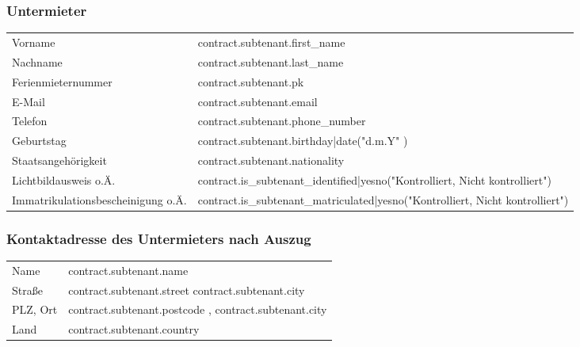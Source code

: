 \documentclass[9pt,pdftex,a4paper]{article}
\begin{document}
\subsubsection*{Untermieter}

\begin{tabularx}{\textwidth}{XX}
Vorname & {{ contract.subtenant.first_name }}\\
Nachname &  {{ contract.subtenant.last_name }}\\
Ferienmieternummer & {{ contract.subtenant.pk }}\\
E-Mail & {{ contract.subtenant.email }}\\
Telefon & {{ contract.subtenant.phone_number }}\\
Geburtstag&  {{ contract.subtenant.birthday|date("d.m.Y" ) }}\\
Staatsangehörigkeit &  {{ contract.subtenant.nationality }}\\
Lichtbildausweis o.Ä. & {{ contract.is_subtenant_identified|yesno("Kontrolliert, Nicht kontrolliert") }}\\
Immatrikulationsbescheinigung o.Ä.&  {{ contract.is_subtenant_matriculated|yesno("Kontrolliert, Nicht kontrolliert") }}\\
\end{tabularx}

\subsubsection*{Kontaktadresse des Untermieters nach Auszug}

\begin{tabularx}{\textwidth}{XX}
Name & {{ contract.subtenant.name }}\\
Straße & {{ contract.subtenant.street }} {{ contract.subtenant.city }}\\
PLZ, Ort & {{ contract.subtenant.postcode }}, {{ contract.subtenant.city }}\\
Land & {{ contract.subtenant.country }}\\
\end{tabularx}

\newpage
\end{document}
